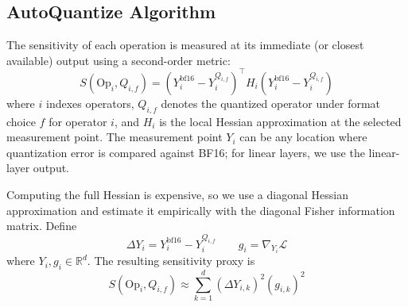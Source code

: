 \begin{table}[h]
\centering
\caption{PTQ Algorithm Ablation}
\label{tab:ptq-algorithm-ablation}
\end{table}

\subsection{AutoQuantize Algorithm}
\label{sec:autoquantize-details}

The sensitivity of each operation is measured at its immediate (or closest available) output using a second-order metric:
\[
S(\mathrm{Op}_i, Q_{i,f}) = \left(Y_i^{\mathrm{bf16}} - Y_i^{Q_{i,f}}\right)^\top H_i \left(Y_i^{\mathrm{bf16}} - Y_i^{Q_{i,f}}\right)
\]
where $i$ indexes operators, $Q_{i,f}$ denotes the quantized operator under format choice $f$ for operator $i$, and $H_i$ is the local Hessian approximation at the selected measurement point. The measurement point $Y_i$ can be any location where quantization error is compared against BF16; for linear layers, we use the linear-layer output.

Computing the full Hessian is expensive, so we use a diagonal Hessian approximation and estimate it empirically with the diagonal Fisher information matrix. Define
\[
\Delta Y_i = Y_i^{\mathrm{bf16}} - Y_i^{Q_{i,f}} \qquad g_i = \nabla_{Y_i} \mathcal{L}
\]
where $Y_i, g_i \in \mathbb{R}^{d}$. The resulting sensitivity proxy is
\[
S(\mathrm{Op}_i, Q_{i,f}) \approx \sum_{k=1}^{d} (\Delta Y_{i,k})^2 (g_{i,k})^2
\]

